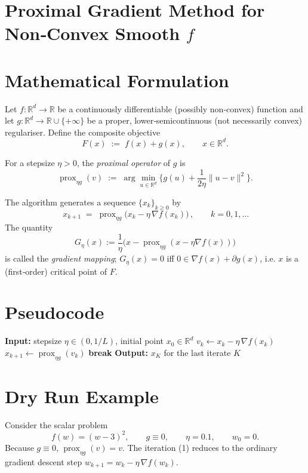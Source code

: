 \documentclass{article}
\newcommand{\prox}{\operatorname{prox}}
\newcommand{\grad}{\nabla}
\newcommand{\R}{\mathbb{R}}
\begin{document}
\section*{Proximal Gradient Method for Non‑Convex Smooth $f$}

\section*{Mathematical Formulation}
Let $f:\R^{d}\rightarrow\R$ be a continuously differentiable (possibly non‑convex) function and let $g:\R^{d}\rightarrow\R\cup\{+\infty\}$ be a proper, lower‑semicontinuous (not necessarily convex) regulariser.  
Define the composite objective
\[
F(x)\;:=\;f(x)+g(x),\qquad x\in\R^{d}.
\]

For a stepsize $\eta>0$, the \emph{proximal operator} of $g$ is
\[
\prox_{\eta g}(v)\;:=\;\arg\min_{u\in\R^{d}}\Big\{g(u)+\frac{1}{2\eta}\|u-v\|^{2}\Big\}.
\]

The algorithm generates a sequence $\{x_{k}\}_{k\ge 0}$ by
\begin{equation}
\boxed{\,x_{k+1}\;=\;\prox_{\eta g}\bigl(x_{k}-\eta\,\grad f(x_{k})\bigr)\,},\qquad k=0,1,\dots
\tag{1}
\end{equation}
The quantity
\[
G_{\eta}(x):=\frac{1}{\eta}\bigl(x-\prox_{\eta g}(x-\eta\grad f(x))\bigr)
\]
is called the \emph{gradient mapping}; $G_{\eta}(x)=0$ iff $0\in\grad f(x)+\partial g(x)$, i.e. $x$ is a (first‑order) critical point of $F$.

\section*{Pseudocode}
\begin{algorithm}[H]
\caption{Proximal Gradient Method}
\begin{algorithmic}[1]
\State \textbf{Input:} stepsize $\eta\in(0,1/L)$, initial point $x_{0}\in\R^{d}$
    \State $v_{k}\gets x_{k}-\eta\,\grad f(x_{k})$ 
    \State $x_{k+1}\gets \prox_{\eta g}(v_{k})$ 
        \State \textbf{break}
    \EndIf
\EndFor
\State \textbf{Output:} $x_{K}$ for the last iterate $K$
\end{algorithmic}
\end{algorithm}

\section*{Dry Run Example}
Consider the scalar problem  
\[
f(w)=(w-3)^{2},\qquad g\equiv0,\qquad \eta=0.1,\qquad w_{0}=0.
\]
Because $g\equiv0$, $\prox_{\eta g}(v)=v$. The iteration (1) reduces to the ordinary gradient descent step  
$w_{k+1}=w_{k}-\eta\,\grad f(w_{k})$.
\end{document}
